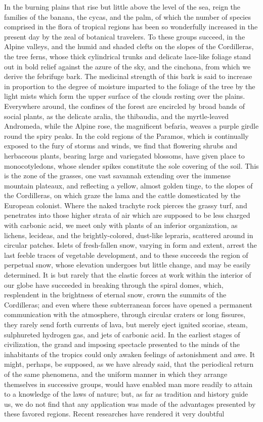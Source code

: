 In the burning plains that rise but little above the level of the sea, reign the families of the banana, the cycas, and the palm, of which the number of species comprised in the flora of tropical regions has been so wonderfully increased in the present day by the zeal of botanical travelers. To these groups succeed, in the Alpine valleys, and the humid and shaded clefts on the slopes of the Cordilleras, the tree ferns, whose thick cylindrical trunks and delicate lace-like foliage stand out in bold relief against the azure of the sky, and the cinchona, from which we derive the febrifuge bark. The medicinal strength of this bark is said to increase in proportion to the degree of moisture imparted to the foliage of the tree by the light mists which form the upper surface of the clouds resting over the plains. Everywhere around, the confines of the forest are encircled by broad bands of social plants, as the delicate aralia, the thibaudia, and the myrtle-leaved Andromeda, while the Alpine rose, the magnificent befaria, weaves a purple girdle round the spiry peaks. In the cold regions of the Paramos, which is continually exposed to the fury of storms and winds, we find that flowering shrubs and herbaceous plants, bearing large and variegated blossoms, have given place to monocotyledons, whose slender spikes constitute the sole covering of the soil. This is the zone of the grasses, one vast savannah extending over the immense mountain plateaux, and reflecting a yellow, almost golden tinge, to the slopes of the Cordilleras, on which graze the lama and the cattle domesticated by the European colonist. Where the naked trachyte rock pierces the grassy turf, and penetrates into those higher strata of air which are supposed to be less charged with carbonic acid, we meet only with plants of an inferior organization, as lichens, lecideas, and the brightly-colored, dust-like lepraria, scattered around in circular patches. Islets of fresh-fallen snow, varying in form and extent, arrest the last feeble traces of vegetable development, and to these succeeds the region of perpetual snow, whose elevation undergoes but little change, and may be easily determined. It is but rarely that the elastic forces at work within the interior of our globe have succeeded in breaking through the spiral domes, which, resplendent in the brightness of eternal snow, crown the summits of the Cordilleras; and even where these subterranean forces have opened a permanent communication with the atmosphere, through circular craters or long fissures, they rarely send forth currents of lava, but merely eject ignited scoriae, steam, sulphureted hydrogen gas, and jets of carbonic acid. In the earliest stages of civilization, the grand and imposing spectacle presented to the minds of the inhabitants of the tropics could only awaken feelings of astonishment and awe. It might, perhaps, be supposed, as we have already said, that the periodical return of the same phenomena, and the uniform manner in which they arrange themselves in successive groups, would have enabled man more readily to attain to a knowledge of the laws of nature; but, as far as tradition and history guide us, we do not find that any application was made of the advantages presented by these favored regions. Recent researches have rendered it very doubtful 